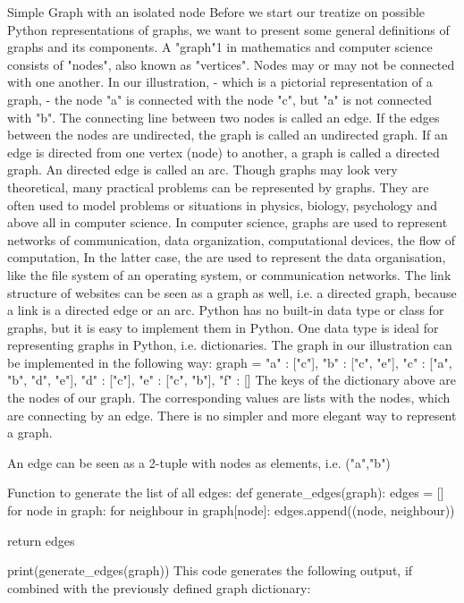 Simple Graph with an isolated node Before we start our treatize on possible Python representations of graphs, we want to present some general definitions of graphs and its components. 
A "graph"1 in mathematics and computer science consists of "nodes", also known as "vertices". Nodes may or may not be connected with one another. In our illustration, - which is a pictorial representation of a graph, - the node "a" is connected with the node "c", but "a" is not connected with "b". The connecting line between two nodes is called an edge. If the edges between the nodes are undirected, the graph is called an undirected graph. If an edge is directed from one vertex (node) to another, a graph is called a directed graph. An directed edge is called an arc. 
Though graphs may look very theoretical, many practical problems can be represented by graphs. They are often used to model problems or situations in physics, biology, psychology and above all in computer science. In computer science, graphs are used to represent networks of communication, data organization, computational devices, the flow of computation, 
In the latter case, the are used to represent the data organisation, like the file system of an operating system, or communication networks. The link structure of websites can be seen as a graph as well, i.e. a directed graph, because a link is a directed edge or an arc. 
Python has no built-in data type or class for graphs, but it is easy to implement them in Python. One data type is ideal for representing graphs in Python, i.e. dictionaries. The graph in our illustration can be implemented in the following way:
graph = { "a" : ["c"],
          "b" : ["c", "e"],
          "c" : ["a", "b", "d", "e"],
          "d" : ["c"],
          "e" : ["c", "b"],
          "f" : []
        }
The keys of the dictionary above are the nodes of our graph. The corresponding values are lists with the nodes, which are connecting by an edge. There is no simpler and more elegant way to represent a graph. 

An edge can be seen as a 2-tuple with nodes as elements, i.e. ("a","b") 

Function to generate the list of all edges:
def generate_edges(graph):
    edges = []
    for node in graph:
        for neighbour in graph[node]:
            edges.append((node, neighbour))

    return edges

print(generate_edges(graph))
This code generates the following output, if combined with the previously defined graph dictionary:
 
